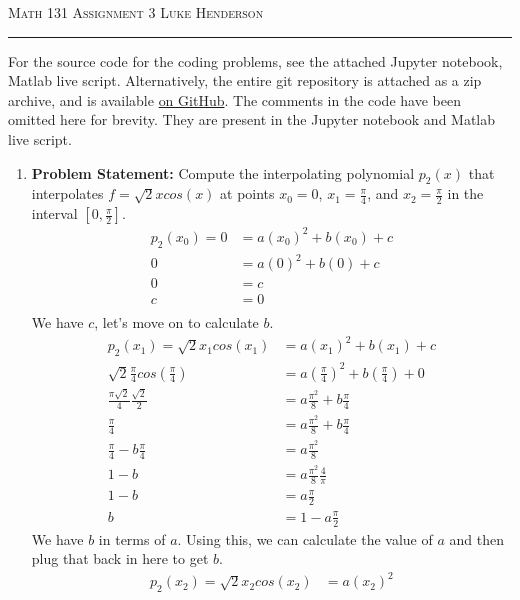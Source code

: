 \documentclass[12pt]{amsart}
\begin{document}
{\scshape Math 131} \hfill {\scshape \large Assignment 3} \hfill {\scshape Luke Henderson}
\smallskip
\hrule
\bigskip

For the source code for the coding problems, see the attached Jupyter notebook, Matlab live script. Alternatively, the entire git repository  is attached as a zip archive, and is available \href{https://github.com/blackHat-Magic/math-131-HW3}{on GitHub}. The comments in the code have been omitted here for brevity. They are present in the Jupyter notebook and Matlab live script.

\begin{enumerate}
    \item \textbf{Problem Statement:} Compute the interpolating polynomial $p_2(x)$ that interpolates $f = \sqrt{2}xcos(x)$ at points $x_0 = 0$, $x_1 = \frac{\pi}{4}$, and $x_2 = \frac{\pi}{2}$ in the interval $[0, \frac{\pi}{2}]$.
    \begin{align*}
        p_2(x_0) = 0 & = a(x_0)^2 + b(x_0) + c \\
        0 & = a(0)^2 + b(0) + c \\
        0 & = c \\
        c & = 0 \\
    \end{align*}
    We have $c$, let's move on to calculate $b$.
    \begin{align*}
        p_2(x_1) = \sqrt{2}x_1cos(x_1) & = a(x_1)^2 + b(x_1) + c \\
        \sqrt{2}\frac{\pi}{4}cos\left(\frac{\pi}{4}\right) & = a\left(\frac{\pi}{4}\right)^2 + b\left(\frac{\pi}{4}\right) + 0 \\
        \frac{\pi\sqrt{2}}{4}\frac{\sqrt{2}}{2} & = a\frac{\pi^2}{8} + b\frac{\pi}{4} \\
        \frac{\pi}{4} & = a\frac{\pi^2}{8} + b\frac{\pi}{4} \\
        \frac{\pi}{4} - b\frac{\pi}{4} & = a\frac{\pi^2}{8} \\
        1 - b & = a\frac{\pi^2}{8}\frac{4}{\pi} \\
        1 - b & = a\frac{\pi}{2} \\
        b & = 1 - a\frac{\pi}{2}
    \end{align*}
    We have $b$ in terms of $a$. Using this, we can calculate the value of $a$ and then plug that back in here to get $b$.
    \begin{align*}
        p_2(x_2) = \sqrt{2}x_2cos(x_2) & = a(x_2)^2
    \end{align*}
\end{enumerate}
\end{document}
